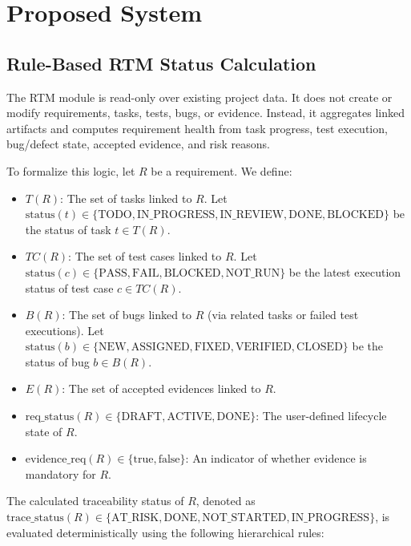 \section{Proposed System}

\subsection{Rule-Based RTM Status Calculation}

The RTM module is read-only over existing project data. It does not create or modify
requirements, tasks, tests, bugs, or evidence. Instead, it aggregates linked
artifacts and computes requirement health from task progress, test execution,
bug/defect state, accepted evidence, and risk reasons.

To formalize this logic, let $R$ be a requirement. We define:
\begin{itemize}
    \item $T(R)$: The set of tasks linked to $R$. Let $\text{status}(t) \in \{\text{TODO}, \text{IN\_PROGRESS}, \text{IN\_REVIEW}, \text{DONE}, \text{BLOCKED}\}$ be the status of task $t \in T(R)$.
    \item $TC(R)$: The set of test cases linked to $R$. Let $\text{status}(c) \in \{\text{PASS}, \text{FAIL}, \text{BLOCKED}, \text{NOT\_RUN}\}$ be the latest execution status of test case $c \in TC(R)$.
    \item $B(R)$: The set of bugs linked to $R$ (via related tasks or failed test executions). Let $\text{status}(b) \in \{\text{NEW}, \text{ASSIGNED}, \text{FIXED}, \text{VERIFIED}, \text{CLOSED}\}$ be the status of bug $b \in B(R)$.
    \item $E(R)$: The set of accepted evidences linked to $R$.
    \item $\text{req\_status}(R) \in \{\text{DRAFT}, \text{ACTIVE}, \text{DONE}\}$: The user-defined lifecycle state of $R$.
    \item $\text{evidence\_req}(R) \in \{\text{true}, \text{false}\}$: An indicator of whether evidence is mandatory for $R$.
\end{itemize}

The calculated traceability status of $R$, denoted as $\text{trace\_status}(R) \in \{\text{AT\_RISK}, \text{DONE}, \text{NOT\_STARTED}, \text{IN\_PROGRESS}\}$, is evaluated deterministically using the following hierarchical rules:

